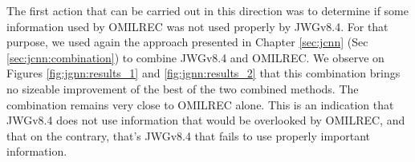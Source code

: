 \documentclass[../main.tex]{subfiles}
\begin{document}
The first action that can be carried out in this direction was to determine if some information used by OMILREC was not used properly by JWGv8.4. For that purpose, we used again the approach presented in Chapter \ref{sec:jcnn} (Sec \ref{sec:jcnn:combination}) to combine JWGv8.4 and OMILREC. We observe on Figures \ref{fig:jgnn:results_1} and \ref{fig:jgnn:results_2} that this combination brings no sizeable improvement  of the best of the two combined methods. The combination remains very close to OMILREC alone. This is an indication that JWGv8.4 does not use information that would be overlooked by OMILREC, and that on the contrary, that's JWGv8.4 that fails to use properly important information.

%
%
\end{document}
